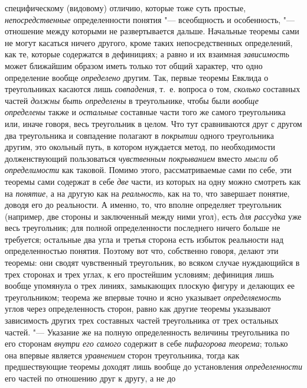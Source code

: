 {{специфическому (видовому) отличию, которые тоже суть простые,
{\em непосредственные}
определенности понятия "--- всеобщность и
особенность, "--- отношение между которыми не развертывается
дальше. Начальные теоремы сами не могут касаться ничего другого, кроме
таких непосредственных определений, как те, которые содержатся в
дефинициях; а равно и их взаимная
{\em зависимость} может
ближайшим образом иметь только тот общий характер, что одно определение
вообще {\em определено}
другим. Так, первые теоремы Евклида о треугольниках касаются
лишь {\em совпадения},
т.~е. вопроса о том,
{\em сколько} составных
частей {\em должны быть определены}
в треугольнике, чтобы были
{\em вообще определены}
также и {\em остальные}
составные части того же самого треугольника или, иначе
говоря, весь треугольник в целом. Что тут сравниваются друг с другом два
треугольника и совпадение полагают в
{\em покрытии} одного
треугольника другим, это окольный путь, в котором нуждается метод, по
необходимости долженствующий пользоваться
{\em чувственным покрыванием}
вместо {\em мысли}
об {\em определимости}
как таковой. Помимо этого, рассматриваемые сами по себе, эти
теоремы сами содержат в себе {\em две}
части, из которых на одну можно смотреть как на
{\em понятие}, а на
другую как на {\em реальность},
как на то, что завершает понятие, доводя его до реальности. А
именно, то, что вполне определяет треугольник (например, две стороны и
заключенный между ними угол), есть
{\em для рассудка} уже
весь треугольник; для полной определенности последнего ничего больше не
требуется; остальные два угла и третья сторона есть избыток реальности над
определенностью понятия. Поэтому вот что, собственно говоря,
делают эти теоремы: они сводят чувственный треугольник, во всяком случае
нуждающийся в трех сторонах и трех углах, к его простейшим условиям;
дефиниция лишь вообще упомянула о трех линиях, замыкающих плоскую фигуру и
делающих ее треугольником; теорема же впервые точно и ясно указывает
{\em определяемость}
углов через определенность сторон, равно как другие теоремы
указывают зависимость других трех составных частей треугольника от трех
остальных частей. "--- Указание же на полную определенность
величины треугольника по его сторонам
{\em внутри его самого}
содержит в себе
{\em пифагорова теорема};
только она впервые является
{\em уравнением} сторон
треугольника, тогда как предшествующие
теоремы
доходят лишь вообще до установления
{\em определенности} его
частей по отношению друг к другу, а не до
}}
